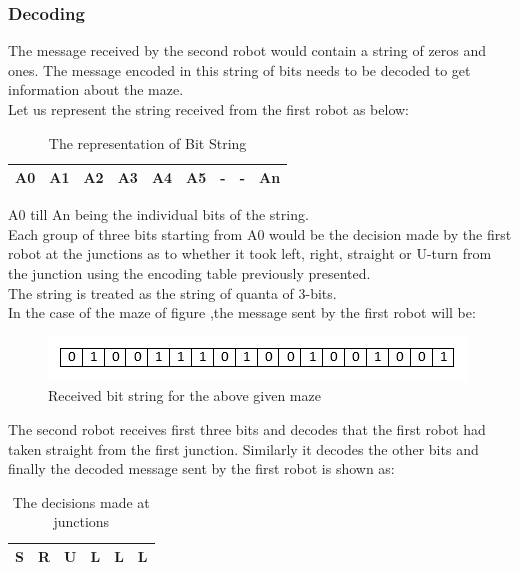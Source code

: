 \subsubsection{Decoding} 
The message received by the second robot would contain a string of zeros and ones. The message encoded in this string of bits needs to be decoded to get information about the maze.\\
Let us represent the string received from the first robot as below:
\begin{table}[h]
\begin{center}
\begin{tabular}{ |c|c|c|c|c|c|c|c|c| }
\hline 
A0&	A1&	A2&	A3&	A4&	A5&	-&	-&	An\\
\hline
\end{tabular}
\caption{The representation of Bit String}
\end{center}
\end{table}
\justify A0 till An  being the individual bits of the string.\\
Each group of three bits starting from A0 would be the decision made by the first robot at the junctions  as to whether it took left, right, straight or U-turn from the junction using the encoding table previously presented.\\
The string is treated as the string of quanta of 3-bits.\\
In the case of the maze of figure ,the message sent by the first robot will be:
\begin{figure}[h]
\center
\includegraphics[scale=1]{bit.PNG}   
\caption{Received bit string for the above given maze}
\end{figure}
\justify The second robot receives first three bits and decodes that the first robot had taken straight from the first junction. Similarly it decodes the other bits and finally the decoded message sent by the first robot is shown as:
\newpage
\begin{table}[h]
\begin{center}
\begin{tabular}{ |c|c|c|c|c|c| }
\hline 
S	&R&	U&	L&	L&	L\\
\hline
\end{tabular}
\caption{The decisions made at junctions}
\end{center}
\end{table}

